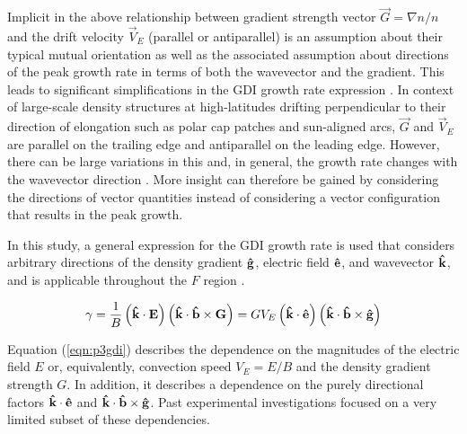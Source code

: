 Implicit in the above relationship  between gradient strength vector \(\vec{G} = \nabla n/n\) and the drift velocity \(\vec{V}_E\) (parallel or antiparallel) is an assumption about their typical mutual orientation as well as the associated assumption about directions of the peak growth rate in terms of both the wavevector and the gradient. This leads to significant simplifications in the GDI growth rate expression \citep{Linson1970,Tsunoda1988}. In context of large-scale density structures at high-latitudes drifting perpendicular to their direction of elongation \citep{Makarevitch2004c,Makarevich2015b} such as polar cap patches and sun-aligned arcs, \(\vec{G}\) and \(\vec{V}_E\) are parallel on the trailing edge and antiparallel on the leading edge. However, there can be large variations in this \citep{Makarevitch2004c} and, in general, the growth rate changes with the wavevector direction \citep{Keskinen1982a,Keskinen1983,Makarevich2014c}. More insight can therefore be gained by considering the directions of vector quantities instead of considering a vector configuration that results in the peak growth.

In this study, a general expression for the GDI growth rate is used that considers arbitrary directions of the density gradient \(\mathbf{\hat{g}}\), electric field \(\mathbf{\hat{e}}\), and wavevector \(\mathbf{\hat{k}}\), and is applicable throughout the \(F\) region \citep[Equation 23]{Makarevich2014c}.

\begin{equation}
  \label{eqn:p3gdi}
  \gamma = \frac{1}{B}\left(\mathbf{\hat{k}}\cdot\mathbf{E}\right)\left(\mathbf{\hat{k}}\cdot\mathbf{\hat{b}}\times\mathbf{G}\right) = GV_E\left(\mathbf{\hat{k}}\cdot\mathbf{\hat{e}}\right)\left(\mathbf{\hat{k}}\cdot\mathbf{\hat{b}}\times\mathbf{\hat{g}}\right)
\end{equation}

Equation (\ref{eqn:p3gdi}) describes the dependence on the magnitudes of the electric field $E$ or, equivalently, convection speed \(V_E=E/B\) and the density gradient strength \(G\). In addition, it describes a dependence on the purely directional factors \(\mathbf{\hat{k}}\cdot\mathbf{\hat{e}}\) and \(\mathbf{\hat{k}}\cdot\mathbf{\hat{b}}\times\mathbf{\hat{g}}\). Past experimental investigations focused on a very limited subset of these dependencies.

